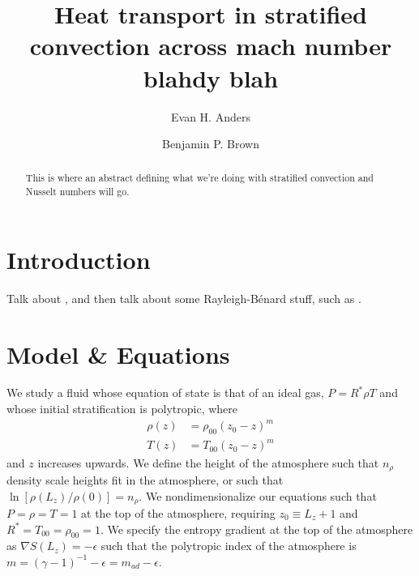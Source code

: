 \documentclass[aps, prl, twocolumn, groupedaddress]{revtex4-1}
\newcommand{\grad}{\ensuremath{\nabla}}
\newcommand{\RB}{Rayleigh-B\'{e}nard }
\begin{document}
\author{Evan H. Anders}
\author{Benjamin P. Brown}
\title{Heat transport in stratified convection across mach number blahdy blah}

\begin{abstract}
This is where an abstract defining what we're doing with stratified convection and Nusselt numbers will go.
\end{abstract}
\maketitle


\section{Introduction \label{section:intro}}
Talk about \cite{hurlburt&all1984, brummell&all1996, cattaneo&all1991},  and then talk about some
\RB stuff, such as \cite{johnston&doering2009}.

\section{Model \& Equations \label{section:model}}
We study a fluid whose equation of state is that of an ideal gas, $P = R^*\rho T$ and whose
initial stratification is polytropic, where
\begin{equation}
\begin{split}
\rho(z) &= \rho_{00}(z_0 - z)^m \\
T(z)    &= T_{00}(z_0 - z)^m
\end{split}
\end{equation}
and $z$ increases upwards. We define the height of the atmosphere such that $n_\rho$ density scale heights fit in the
atmosphere, or such that $\ln[\rho(L_{z})/\rho(0)] = n_\rho$.  We nondimensionalize our equations such that 
$P = \rho = T = 1$ at the top of the atmosphere, requiring $z_0 \equiv L_z + 1$ and $R^* = T_{00} = \rho_{00} = 1$.  
We specify the entropy gradient at the top of the atmosphere as $\grad S(L_z) = -\epsilon$ such that the
polytropic index of the atmosphere is $m = (\gamma - 1)^{-1} - \epsilon = m_{ad} - \epsilon$.
\end{document}
